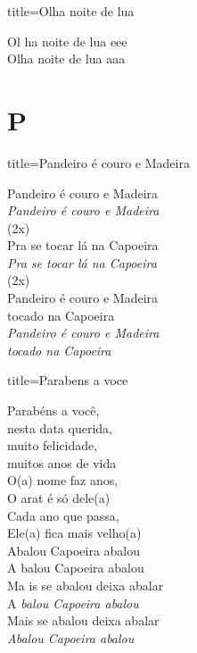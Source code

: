 \documentclass[fontsize=14pt, paper=a4, twoside, DIV=20]{scrreprt} %
\newcommand\chapTOC[1]{
    \chapter*{#1}
    \addcontentsline{toc}{chapter}{#1}
    \markboth{#1}{#1}}
\begin{document}
\begin{multicols*}{2}
\begin{song}{title={Olha noite de lua}}
        \begin{verse*}
            Ol ha noite de lua eee\\
            Olha noite de lua aaa\\
        \end{verse*}
\end{song}

\chapTOC{P}

\begin{song}{title={Pandeiro é couro e Madeira}}
        \begin{verse*}
             Pandeiro é couro e Madeira  \\
            \textit{ Pandeiro é couro e Madeira} \\
            (2x)\\
            Pra se tocar lá na Capoeira\\
            \textit{Pra se tocar lá na Capoeira}\\
            (2x)\\
            Pandeiro é couro e Madeira \\
            tocado na Capoeira \\
            \textit{Pandeiro é couro e Madeira \\ tocado na Capoeira} \\
        \end{verse*}
\end{song}
 
\begin{song}{title={Parabens a voce}}
        \begin{verse*}
            Parabéns a você,\\
            nesta data querida,\\
            muito felicidade,\\
            muitos anos de vida\\
            O(a) nome faz anos,\\
            O arat é só dele(a)\\
            Cada ano que passa,\\
            Ele(a) fica mais velho(a)\\
            Abalou Capoeira abalou\\
            A balou Capoeira abalou\\
            Ma is se abalou deixa abalar\\
            A \textit{balou Capoeira abalou}\\
            Mais se abalou deixa abalar\\
            \textit{Abalou Capoeira abalou}\\
        \end{verse*}
\end{song}


\end{multicols*}
\end{document}
